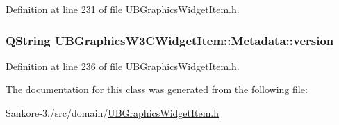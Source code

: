 Definition at line 231 of file U\-B\-Graphics\-Widget\-Item.\-h.

\hypertarget{class_u_b_graphics_w3_c_widget_item_1_1_metadata_a15316a02ed1ad1971ee802f5e5eb2296}{
\subsubsection[{version}]{\setlength{\rightskip}{0pt plus 5cm}Q\-String U\-B\-Graphics\-W3\-C\-Widget\-Item\-::\-Metadata\-::version}}\label{d2/dea/class_u_b_graphics_w3_c_widget_item_1_1_metadata_a15316a02ed1ad1971ee802f5e5eb2296}


Definition at line 236 of file U\-B\-Graphics\-Widget\-Item.\-h.



The documentation for this class was generated from the following file\-:\begin{DoxyCompactItemize}
\item 
Sankore-\/3./src/domain/\hyperlink{_u_b_graphics_widget_item_8h}{U\-B\-Graphics\-Widget\-Item.\-h}\end{DoxyCompactItemize}
